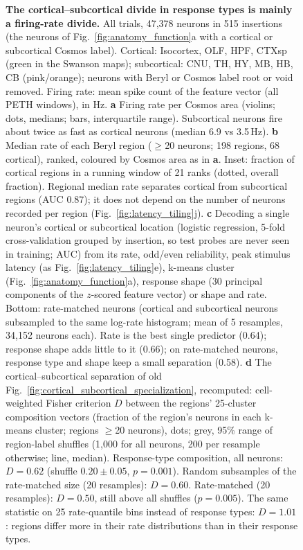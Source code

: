   \iffalse %
\begin{figure}[h]
  \caption{\textbf{The cortical--subcortical divide in response types is mainly a firing-rate divide.}
All trials, 47,378 neurons in 515 insertions (the neurons of Fig.~\ref{fig:anatomy_function}a with a cortical or subcortical Cosmos label). Cortical: Isocortex, OLF, HPF, CTXsp (green in the Swanson maps); subcortical: CNU, TH, HY, MB, HB, CB (pink/orange); neurons with Beryl or Cosmos label root or void removed. Firing rate: mean spike count of the feature vector (all PETH windows), in Hz.
\textbf{a} Firing rate per Cosmos area (violins; dots, medians; bars, interquartile range). Subcortical neurons fire about twice as fast as cortical neurons (median 6.9 vs 3.5\,Hz).
\textbf{b} Median rate of each Beryl region ($\geq$20 neurons; 198 regions, 68 cortical), ranked, coloured by Cosmos area as in \textbf{a}. Inset: fraction of cortical regions in a running window of 21 ranks (dotted, overall fraction). Regional median rate separates cortical from subcortical regions (AUC 0.87); it does not depend on the number of neurons recorded per region (Fig.~\ref{fig:latency_tiling}j).
\textbf{c} Decoding a single neuron's cortical or subcortical location (logistic regression, 5-fold cross-validation grouped by insertion, so test probes are never seen in training; AUC) from its rate, odd/even reliability, peak stimulus latency (as Fig.~\ref{fig:latency_tiling}e), k-means cluster (Fig.~\ref{fig:anatomy_function}a), response shape (30 principal components of the $z$-scored feature vector) or shape and rate. Bottom: rate-matched neurons (cortical and subcortical neurons subsampled to the same log-rate histogram; mean of 5 resamples, 34,152 neurons each). Rate is the best single predictor (0.64); response shape adds little to it (0.66); on rate-matched neurons, response type and shape keep a small separation (0.58).
\textbf{d} The cortical--subcortical separation of old Fig.~\ref{fig:cortical_subcortical_specialization}, recomputed: cell-weighted Fisher criterion $D$ between the regions' 25-cluster composition vectors (fraction of the region's neurons in each k-means cluster; regions $\geq$20 neurons), dots; grey, 95\% range of region-label shuffles (1,000 for all neurons, 200 per resample otherwise; line, median). Response-type composition, all neurons: $D=0.62$ (shuffle $0.20\pm0.05$, $p=0.001$). Random subsamples of the rate-matched size (20 resamples): $D=0.60$. Rate-matched (20 resamples): $D=0.50$, still above all shuffles ($p=0.005$). The same statistic on 25 rate-quantile bins instead of response types: $D=1.01$: regions differ more in their rate distributions than in their response types.
}
\end{figure}
